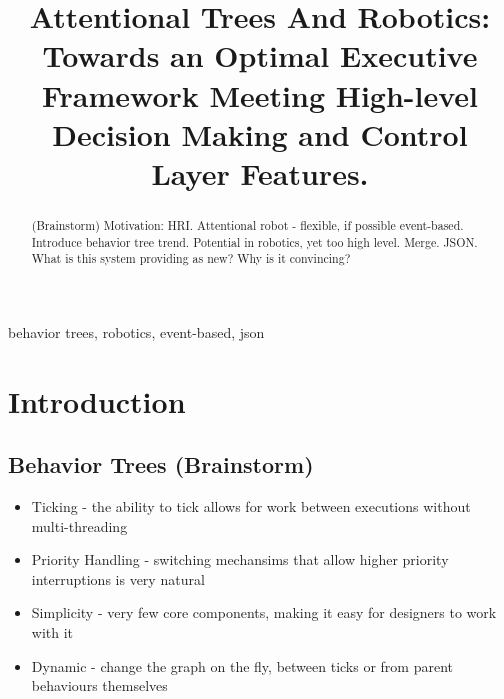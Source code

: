 \documentclass[conference]{IEEEtran}
\begin{document}
\title{Attentional Trees And Robotics: Towards an Optimal Executive Framework Meeting High-level Decision Making and Control Layer Features.\\
}

\author{
\and
{}
}

\maketitle

\begin{abstract}
(Brainstorm) Motivation: HRI. Attentional robot - flexible, if possible event-based. Introduce behavior tree trend. Potential in robotics, yet too high level. Merge. JSON. What is this system providing as new? Why is it convincing?
\end{abstract}

\begin{IEEEkeywords}
behavior trees, robotics, event-based, json
\end{IEEEkeywords}

\section{Introduction}
\subsection{Behavior Trees (Brainstorm)}
\begin{itemize}
\item Ticking - the ability to tick allows for work between executions without multi-threading
\item Priority Handling - switching mechansims that allow higher priority interruptions is very natural
\item Simplicity - very few core components, making it easy for designers to work with it
\item Dynamic - change the graph on the fly, between ticks or from parent behaviours themselves
\end{itemize}
\end{document}

